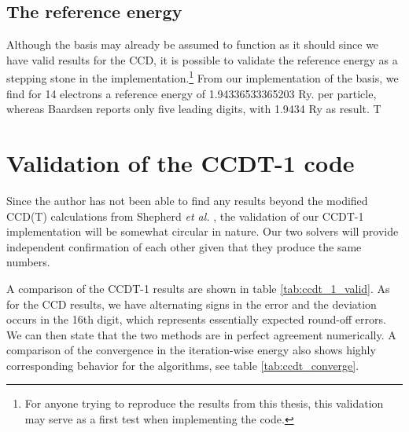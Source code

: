 \subsection{The reference energy}

Although the basis may already be assumed to function as it should
since we have valid results for the CCD, it is possible to validate
the reference energy as a stepping stone in the
implementation.\footnote{For anyone trying to reproduce the results
  from this thesis, this validation may serve as a first test
  when implementing the code.} From our implementation of the basis,
we find for 14 electrons a reference energy of 1.94336533365203
Ry. per particle, whereas Baardsen \cite{Baardsen2015} reports only five leading digits, with
1.9434 Ry as result. T


\section{Validation of the CCDT-1 code}

Since the author has not been able to find any results beyond the
modified CCD(T) calculations from Shepherd {\em et al.} \cite{Shepherd2013},
the validation of our CCDT-1 implementation will be somewhat circular in nature. Our
two solvers will provide independent confirmation of each other given
that they produce the same numbers.

A comparison of the CCDT-1 results are shown in table
\ref{tab:ccdt_1_valid}. As for the CCD results, we have alternating
signs in the error and the deviation occurs in the 16th digit, which represents essentially
expected round-off errors. We can then state that the two methods  are in  perfect agreement numerically. A
comparison of the convergence in the iteration-wise energy also shows
highly corresponding behavior for the algorithms, see table
\ref{tab:ccdt_converge}.

